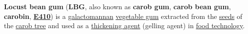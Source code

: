 \textbf{Locust bean gum} (\textbf{LBG}, also known as \textbf{carob
gum}, \textbf{carob bean gum}, \textbf{carobin},
\textbf{\href{/wiki/E_number}{E410}}) is a
\href{/wiki/Galactomannan}{galactomannan}
\href{/wiki/Gum_(botany)}{vegetable gum} extracted from the
\href{/wiki/Seed}{seeds} of the \href{/wiki/Ceratonia_siliqua}{carob
tree} and used as a \href{/wiki/Thickening_agent}{thickening agent}
(gelling agent) in \href{/wiki/Food_technology}{food technology}.
